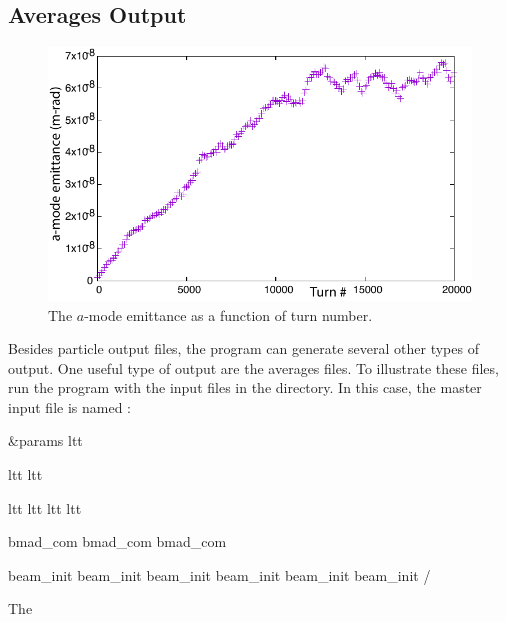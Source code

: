 \documentclass{hitec}     %
\begin{document}
{\subsection{Averages Output}

\begin{figure}[b]
  \centering
  \includegraphics[width=0.8\linewidth]{figures/emit.pdf}
  \caption{The $a$-mode emittance as a function of turn number.}
  \label{f:emit}
\end{figure}

Besides particle output files, the \ltt program can generate several other types of output.
One useful type of output are the averages files. To illustrate these files, run the \ltt program with the input files
in the  directory. In this case, the master input file is named
:
\begin{code}
&params
  ltt%

  ltt%
  ltt%

  ltt%
  ltt%
  ltt%
  ltt%

  bmad_com%
  bmad_com%
  bmad_com%

  beam_init%
  beam_init%
  beam_init%
  beam_init%
  beam_init%
  beam_init%
/
\end{code}
The \vn{ltt%
Using a map makes tracking fast but the construction of the map at the beginning can take some time. In this case,
a very simple lattice is used to speed up the process. If radiation effects are turned on as they are here, the
radiation effects are included in the map. The map is partially inverted to make, in the limit of no radiation, the
application of the map symplectic.

}}
\end{document}
